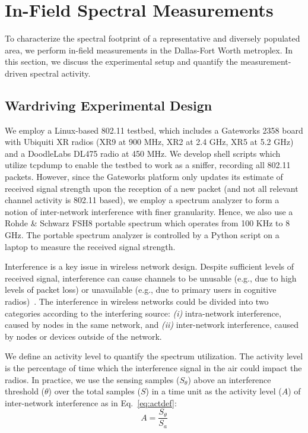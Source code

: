 \section{In-Field Spectral Measurements}
\label{sec:measurements}

To characterize the spectral footprint of a representative and diversely populated area, 
we perform in-field measurements in the Dallas-Fort Worth metroplex. In this section, 
we discuss the experimental setup and quantify the measurement-driven spectral activity.
 
\subsection{Wardriving Experimental Design}
\label{subsec:measurementdesign}
We employ a Linux-based 802.11 testbed, which includes a Gateworks 2358 board with Ubiquiti XR radios 
(XR9 at 900 MHz, XR2 at 2.4 GHz, XR5 at 5.2 GHz) and a DoodleLabs DL475 radio at 450 MHz. We develop 
shell scripts which utilize tcpdump to enable the testbed to work as a sniffer, recording all 802.11 
packets. However, since the Gateworks platform only updates its estimate of received signal strength 
upon the reception of a new packet (and not all relevant channel activity is 802.11 based), we employ 
a spectrum analyzer to form a notion of inter-network interference with finer granularity.  Hence, we 
also use a Rohde \& Schwarz FSH8 portable spectrum which operates from 100 KHz to 8 GHz. The portable spectrum 
analyzer is controlled by a Python script on a laptop to measure the received signal strength.


Interference is a key issue in wireless network design. Despite sufficient levels of received signal, 
interference can cause channels to be unusable (e.g., due to high levels of packet loss) or unavailable 
(e.g., due to primary users in cognitive radios)~\cite{haykin2005cognitive}. 
The interference in wireless networks could be divided into two categories according to the interfering 
source: {\it (i)} intra-network interference, caused by nodes in the same network, and {\it (ii)} 
inter-network interference, caused by nodes or devices outside of the network. 

We define an activity level to quantify the spectrum utilization. The activity level is the percentage 
of time which the interference signal in the air could impact the radios. In practice, we use the sensing 
samples ($S_\theta$) above an interference threshold ($\theta$) over the total samples ($S$) in a time 
unit as the activity level ($A$) of inter-network interference as in Eq.~\ref{eq:actdef}:
\begin{equation}
\label{eq:actdef}
A=\frac{S_\theta}{S_a}
\end{equation}



